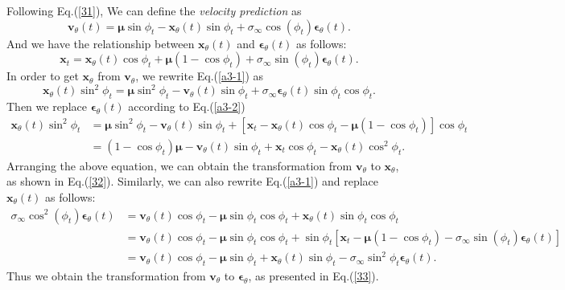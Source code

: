Following Eq.(\ref{31}), We can define the \textit{velocity prediction} as
\begin{equation}
\boldsymbol{v}_\theta(t)=\boldsymbol{\mu}\sin\phi_t-\boldsymbol{x}_\theta(t)\sin\phi_t+\sigma_\infty\cos(\phi_t)\boldsymbol\epsilon_\theta(t). \label{a3-1}
\end{equation}
And we have the relationship between $\boldsymbol{x}_\theta(t)$ and $\boldsymbol{\epsilon}_\theta(t)$ as follows:
\begin{equation}
\boldsymbol{x}_t=\boldsymbol{x}_\theta(t)\cos{\phi_t}+\boldsymbol{\mu}(1-\cos{\phi_t})+\sigma_\infty\sin{(\phi_t)}\boldsymbol{\epsilon}_\theta(t).
\label{a3-2}
\end{equation}
In order to get $\boldsymbol{x}_\theta$ from $\boldsymbol{v}_\theta$, we rewrite Eq.(\ref{a3-1}) as
\begin{equation}
\boldsymbol{x}_\theta(t)\sin^2\phi_t=\boldsymbol{\mu}\sin^2\phi_t-\boldsymbol{v}_\theta(t)\sin\phi_t+\sigma_\infty\boldsymbol{\epsilon}_\theta(t)\sin\phi_t\cos\phi_t.
\end{equation}
Then we replace $\boldsymbol{\epsilon}_\theta(t)$ according to Eq.(\ref{a3-2})
\begin{align}
\boldsymbol{x}_\theta(t)\sin^2\phi_t&=\boldsymbol{\mu}\sin^2\phi_t-\boldsymbol{v}_\theta(t)\sin\phi_t+\left[\boldsymbol{x}_t-\boldsymbol{x}_\theta(t)\cos{\phi_t}-\boldsymbol{\mu}(1-\cos{\phi_t}) \right]\cos\phi_t \nonumber\\
&=(1-\cos\phi_t)\boldsymbol{\mu}-\boldsymbol{v}_\theta(t)\sin\phi_t+\boldsymbol{x}_t\cos\phi_t-\boldsymbol{x}_\theta(t)\cos^2\phi_t.
\end{align}
Arranging the above equation, we can obtain the transformation from $\boldsymbol{v}_\theta$ to $\boldsymbol{x}_\theta$, as shown in Eq.(\ref{32}).
Similarly, we can also rewrite Eq.(\ref{a3-1}) and replace $\boldsymbol{x}_\theta(t)$ as follows:
\begin{align}
\sigma_\infty\cos^2(\phi_t)\boldsymbol{\epsilon}_\theta(t)&=
\boldsymbol{v}_\theta(t)\cos\phi_t-\boldsymbol{\mu}\sin\phi_t\cos\phi_t+\boldsymbol{x}_\theta(t)\sin\phi_t\cos\phi_t \nonumber\\
&=\boldsymbol{v}_\theta(t)\cos\phi_t-\boldsymbol{\mu}\sin\phi_t\cos\phi_t+\sin\phi_t\left[\boldsymbol{x}_t-\boldsymbol{\mu}(1-\cos{\phi_t})-\sigma_\infty\sin{(\phi_t)}\boldsymbol{\epsilon}_\theta(t)\right] \nonumber\\
&=\boldsymbol{v}_\theta(t)\cos\phi_t-\boldsymbol{\mu}\sin\phi_t+\boldsymbol{x}_\theta(t)\sin\phi_t-\sigma_\infty\sin^2\phi_t\boldsymbol{\epsilon}_\theta(t).
\end{align}
Thus we obtain the transformation from $\boldsymbol{v}_\theta$ to $\boldsymbol{\epsilon}_\theta$, as presented in Eq.(\ref{33}).
